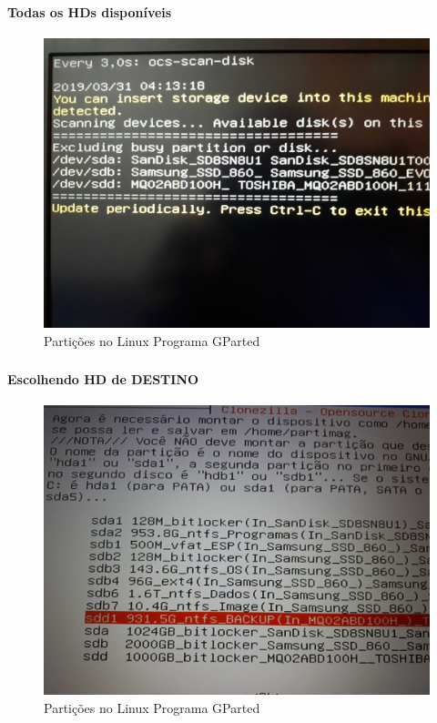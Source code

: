 \documentclass{beamer}
\begin{document}
\begin{frame}[plain,c]
   \frametitle{\insertsection}
    \framesubtitle{Todas os HDs disponíveis}
    \begin{figure}[!h]
        
        \includegraphics[width=1\linewidth]{images/backup/bkp9.jpg}
        \caption{Partições no Linux Programa GParted}
    \end{figure}
\end{frame}

\begin{frame}[plain,c]
   \frametitle{\insertsection}
    \framesubtitle{Escolhendo HD de DESTINO}
    \begin{figure}[!h]
        \includegraphics[width=1\linewidth]{images/backup/bkp10.jpg}
        \caption{Partições no Linux Programa GParted}
    \end{figure}
\end{frame}
\end{document}
